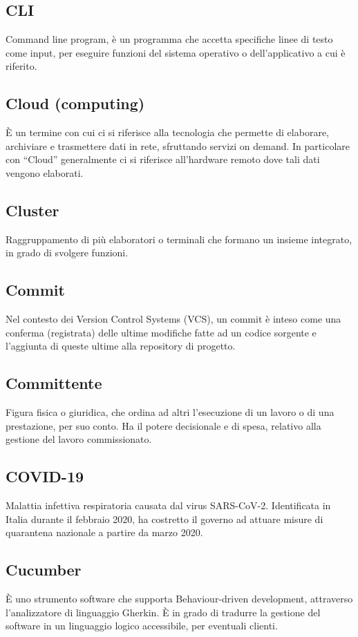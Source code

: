 	\subsection*{CLI}
	Command line program, è un programma che accetta specifiche linee di testo come input, per eseguire funzioni del sistema operativo o dell’applicativo a cui è riferito.
	\subsection*{Cloud (computing)}
	È un termine con cui ci si riferisce alla tecnologia che permette di elaborare, archiviare e trasmettere dati in rete, sfruttando servizi on demand. In particolare con “Cloud” generalmente ci si riferisce all’hardware remoto dove tali dati vengono elaborati.
	\subsection*{Cluster}
	Raggruppamento di più elaboratori o terminali che formano un insieme integrato, in grado di svolgere funzioni.
	\subsection*{Commit}
	Nel contesto dei Version Control Systems (VCS), un commit è inteso come una conferma (registrata) delle ultime modifiche fatte ad un codice sorgente e l’aggiunta di queste ultime alla repository di progetto.
	\subsection*{Committente}
	Figura fisica o giuridica, che ordina ad altri l’esecuzione di un lavoro o di una prestazione, per suo conto. Ha il potere decisionale e di spesa, relativo alla gestione del lavoro commissionato.
	\subsection*{COVID-19}
	Malattia infettiva respiratoria causata dal virus SARS-CoV-2. Identificata in Italia durante il febbraio 2020, ha costretto il governo ad attuare misure di quarantena nazionale a partire da marzo 2020.
	\subsection*{Cucumber}
	È uno strumento software che supporta Behaviour-driven development, attraverso l’analizzatore di linguaggio Gherkin. È in grado di tradurre la gestione del software in un linguaggio logico accessibile, per eventuali clienti. 
\pagebreak
